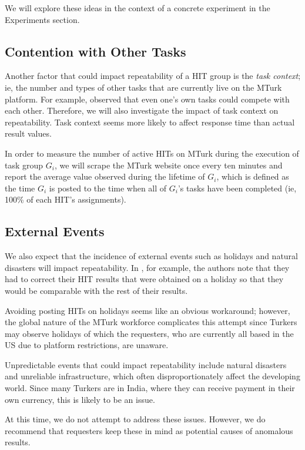 \documentclass[letterpaper]{article}
\begin{document}
We will explore these ideas in the context of a concrete experiment in the Experiments section.

\subsection{Contention with Other Tasks}

Another factor that could impact repeatability of a HIT group is the \textit{task context}; ie, the number and types of other tasks that are currently live on the MTurk platform.  For example, \cite{Franklin:2011} observed that even one's own tasks could compete with each other.  Therefore, we will also investigate the impact of task context on repeatability.  Task context seems more likely to affect response time than actual result values.

In order to measure the number of active HITs on MTurk during the execution of task group \(G_i\), we will scrape the MTurk website once every ten minutes and report the average value observed during the lifetime of \(G_i\), which is defined as the time \(G_i\) is posted to the time when all of \(G_i\)'s tasks have been completed (ie, 100\% of each HIT's assignments).

\subsection{External Events}

We also expect that the incidence of external events such as holidays and natural disasters will impact repeatability.  In \cite{Heer:2010}, for example, the authors note that they had to correct their HIT results that were obtained on a holiday so that they would be comparable with the rest of their results.  

Avoiding posting HITs on holidays seems like an obvious workaround; however, the global nature of the MTurk workforce complicates this attempt since Turkers may observe holidays of which the requesters, who are currently all based in the US due to platform restrictions, are unaware.  

Unpredictable events that could impact repeatability include natural disasters and unreliable infrastructure, which often disproportionately affect the developing world.  Since many Turkers are in India, where they can receive payment in their own currency, this is likely to be an issue.  

At this time, we do not attempt to address these issues.  However, we do recommend that requesters keep these in mind as potential causes of anomalous results.
\end{document}
